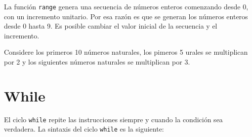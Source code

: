 La función \texttt{range} genera una secuencia de números enteros
comenzando desde 0, con un incremento unitario. Por esa razón es que se
generan los números enteros desde 0 hasta 9. Es posible cambiar el valor
inicial de la secuencia y el incremento.

\begin{code} Considere los primeros 10 números naturales, los
pimeros 5 urales se multiplican por 2 y los siguientes números naturales
se multiplican por 3.

\begin{Shaded}
\begin{Highlighting}[]
     \NormalTok{(}\NormalTok{,}\NormalTok{):}
        \OperatorTok{\textless{}=}\NormalTok{:}
            \NormalTok{(}\SpecialCharTok{\{}\SpecialCharTok{\}}\SpecialStringTok{ {-}\textgreater{} }\SpecialCharTok{\{}\OperatorTok{*}\SpecialCharTok{\}}\SpecialStringTok{\textquotesingle{}}\NormalTok{)}
        \NormalTok{:}
            \NormalTok{(}\SpecialCharTok{\{}\SpecialCharTok{\}}\SpecialStringTok{ {-}\textgreater{} }\SpecialCharTok{\{}\OperatorTok{*}\SpecialCharTok{\}}\SpecialStringTok{\textquotesingle{}}\NormalTok{)}
\end{Highlighting}
\end{Shaded}
\end{code}

\section{While} 
El ciclo \texttt{while} repite las instrucciones siempre y cuando la
condición sea verdadera. La sintaxis del ciclo \texttt{while} es la
siguiente:

\begin{Shaded}
\begin{Highlighting}[]

\end{Highlighting}
\end{Shaded}

